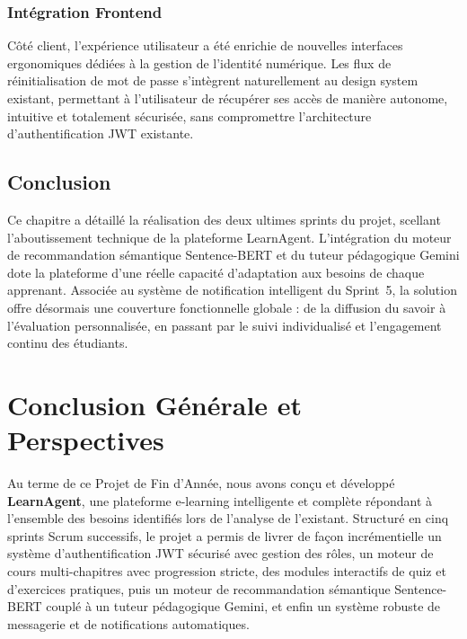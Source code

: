 \documentclass[12pt,a4paper]{report}
\begin{document}
\subsection{Intégration Frontend}

Côté client, l'expérience utilisateur a été enrichie de nouvelles interfaces ergonomiques dédiées à la gestion de l'identité numérique. Les flux de réinitialisation de mot de passe s'intègrent naturellement au design system existant, permettant à l'utilisateur de récupérer ses accès de manière autonome, intuitive et totalement sécurisée, sans compromettre l'architecture d'authentification JWT existante.

\section*{Conclusion}

Ce chapitre a détaillé la réalisation des deux ultimes sprints du projet, scellant l'aboutissement technique de la plateforme LearnAgent. L'intégration du moteur de recommandation sémantique Sentence-BERT et du tuteur pédagogique Gemini dote la plateforme d'une réelle capacité d'adaptation aux besoins de chaque apprenant. Associée au système de notification intelligent du Sprint~5, la solution offre désormais une couverture fonctionnelle globale : de la diffusion du savoir à l'évaluation personnalisée, en passant par le suivi individualisé et l'engagement continu des étudiants.

\newpage


\chapter*{Conclusion Générale et Perspectives}

Au terme de ce Projet de Fin d'Année, nous avons conçu et développé \textbf{LearnAgent}, une plateforme e-learning intelligente et complète répondant à l'ensemble des besoins identifiés lors de l'analyse de l'existant. Structuré en cinq sprints Scrum successifs, le projet a permis de livrer de façon incrémentielle un système d'authentification JWT sécurisé avec gestion des rôles, un moteur de cours multi-chapitres avec progression stricte, des modules interactifs de quiz et d'exercices pratiques, puis un moteur de recommandation sémantique Sentence-BERT couplé à un tuteur pédagogique Gemini, et enfin un système robuste de messagerie et de notifications automatiques.
\end{document}
